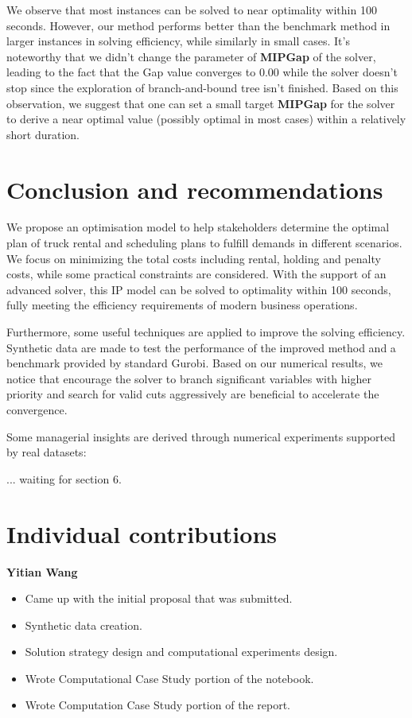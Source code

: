 \documentclass[a4paper,12pt]{article}
\begin{document}
We observe that most instances can be solved to near optimality within 100 seconds. However, our method performs better than the benchmark method in larger instances in solving efficiency, while similarly in small cases. It's noteworthy that we didn't change the parameter of \textbf{MIPGap} of the solver, leading to the fact that the Gap value converges to 0.00 while the solver doesn't stop since the exploration of branch-and-bound tree isn't finished. Based on this observation, we suggest that one can set a small target \textbf{MIPGap} for the solver to derive a near optimal value (possibly optimal in most cases) within a relatively short duration.

\section{Conclusion and recommendations}\label{sec:conclusion-and-recommendations}

We propose an optimisation model to help stakeholders determine the optimal plan of truck rental and scheduling plans to fulfill demands in different scenarios. We focus on minimizing the total costs including rental, holding and penalty costs, while some practical constraints are considered. With the support of an advanced solver, this IP model can be solved to optimality within 100 seconds, fully meeting the efficiency requirements of modern business operations.

Furthermore, some useful techniques are applied to improve the solving efficiency. Synthetic data are made to test the performance of the improved method and a benchmark provided by standard Gurobi. Based on our numerical results, we notice that encourage the solver to branch significant variables with higher priority and search for valid cuts aggressively are beneficial to accelerate the convergence.

Some managerial insights are derived through numerical experiments supported by real datasets:

... waiting for section 6.



\section{Individual contributions}\label{sec:individual-contributions}
\textbf{Yitian Wang}
\begin{itemize}
    \item Came up with the initial proposal that was submitted.
    \item Synthetic data creation.
    \item Solution strategy design and computational experiments design.
    \item Wrote Computational Case Study portion of the notebook.
    \item Wrote Computation Case Study portion of the report.
\end{itemize}
\end{document}
